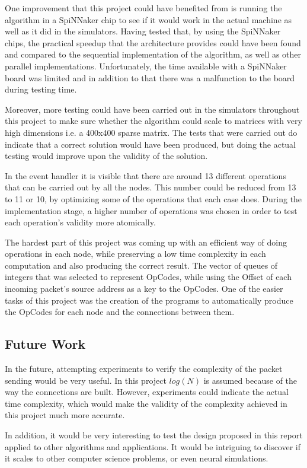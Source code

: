 \documentclass[12pt,twosided]{article}
\begin{document}
One improvement that this project could have benefited from is running the algorithm in a SpiNNaker chip to see if it would work in the actual machine as well as it did in the simulators. Having tested that, by using the SpiNNaker chips, the practical speedup that the architecture provides could have been found and compared to the sequential implementation of the algorithm, as well as other parallel implementations. Unfortunately, the time available with a SpiNNaker board was limited and in addition to that there was a malfunction to the board during testing time.

Moreover, more testing could have been carried out in the simulators throughout this project to make sure whether the algorithm could scale to matrices with very high dimensions i.e. a 400x400 sparse matrix. The tests that were carried out do indicate that a correct solution would have been produced, but doing the actual testing would improve upon the validity of the solution.

In the event handler it is visible that there are around 13 different operations that can be carried out by all the nodes. This number could be reduced from 13 to 11 or 10, by optimizing some of the operations that each case does. During the implementation stage, a higher number of operations was chosen in order to test each operation's validity more atomically.

The hardest part of this project was coming up with an efficient way of doing operations in each node, while preserving a low time complexity in each computation and also producing the correct result. The vector of queues of integers that was selected to represent OpCodes, while using the Offset of each incoming packet's source address as a key to the OpCodes. One of the easier tasks of this project was the creation of the programs to automatically produce the OpCodes for each node and the connections between them.
\subsection{Future Work}
In the future, attempting experiments to verify the complexity of the packet sending would be very useful. In this project $log(N)$ is assumed because of the way the connections are built. However, experiments could indicate the actual time complexity, which would make the validity of the complexity achieved in this project much more accurate.

In addition, it would be very interesting to test the design proposed in this report applied to other algorithms and applications. It would be intriguing to discover if it scales to other computer science problems, or even neural simulations.
\end{document}
